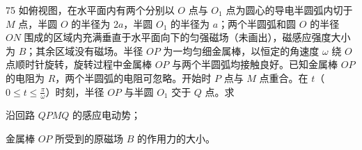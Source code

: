\begin{problem}[第34届物理竞赛复赛][电磁感应]{75}
    如俯视图，在水平面内有两个分别以 $O$ 点与 $O_{1}$ 点为圆心的导电半圆弧内切于 $M$ 点，半圆 $O$ 的半径为 $2a$，半圆 $O_{1}$ 的半径为 $a$；两个半圆弧和圆 $O$ 的半径 $ON$ 围成的区域内充满垂直于水平面向下的匀强磁场（未画出），磁感应强度大小为 $B$；其余区域没有磁场。半径 $OP$ 为一均匀细金属棒，以恒定的角速度 $\omega$ 绕 $O$ 点顺时针旋转，旋转过程中金属棒 $OP$ 与两个半圆弧均接触良好。已知金属棒 $OP$ 的电阻为 $R$，两个半圆弧的电阻可忽略。开始时 $P$ 点与 $M$ 点重合。在 $t$（$0 \leq t \leq \frac{\pi}{\omega}$）时刻，半径 $OP$ 与半圆 $O_{1}$ 交于 $Q$ 点。求
    \begin{subproblem}
        沿回路 $QPMQ$ 的感应电动势；
    \end{subproblem}
    \begin{subproblem}
        金属棒 $OP$ 所受到的原磁场 $B$ 的作用力的大小。
    \end{subproblem}
\end{problem}